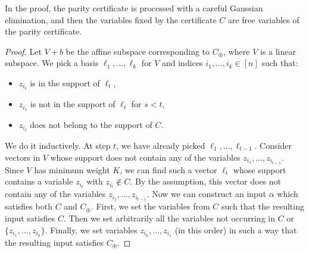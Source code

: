 \documentclass[10pt,a4paper]{article}
\begin{document}
In the proof, the parity certificate is processed with a careful Gaussian elimination, and then the variables fixed by the certificate $C$ are free variables of the parity certificate.
\begin{proof}
Let $V+b$ be the affine subspace corresponding to $C_\oplus$, where $V$ is a linear subspace. We pick a basis $\ell_1,\ldots,\ell_k$ for $V$ and indices $i_1,\ldots,i_k\in[n]$ such that:
\begin{itemize}
\item $z_{i_t}$ is in the support of $\ell_t$,
\item $z_{i_s}$ is not in the support of $\ell_t$ for $s<t$,
\item $z_{i_t}$ does not belong to the support of $C$.
\end{itemize}
We do it inductively. At step $t$, we have already picked $\ell_1,\ldots,\ell_{t-1}$. Consider vectors in $V$ whose support does not contain any of the variables $z_{i_1},\ldots,z_{i_{t-1}}$. Since $V$ has minimum weight $K$, we can find such a vector $\ell_t$ whose support contains a variable $z_{i_t}$ with $z_{i_t}\notin C$. By the assumption, this vector does not contain any of the variables $z_{i_1},\ldots,z_{i_{t-1}}$.
Now we can construct an input $\alpha$ which satisfies both $C$ and $C_\oplus$. First, we set the variables from $C$ such that the resulting input satisfies $C$. Then we set arbitrarily all the variables not occurring in $C$ or $\{z_{i_1},\ldots,z_{i_k}\}$. Finally, we set variables $z_{i_k},\ldots,z_{i_1}$ (in this order) in such a way that the resulting input satisfies $C_\oplus$.
\end{proof}
\end{document}
